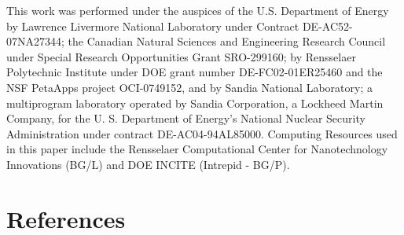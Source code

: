 \documentclass[letterpaper]{jpconf}
\begin{document}
\ack
This work was performed under the auspices of the U.S. Department of
Energy by Lawrence Livermore National Laboratory under Contract
DE-AC52-07NA27344; the Canadian Natural Sciences and Engineering
Research Council under Special Research Opportunities Grant
SRO-299160; by Rensselaer Polytechnic Institute under DOE grant number
DE-FC02-01ER25460 and the NSF PetaApps project OCI-0749152, and by
Sandia National Laboratory; a multiprogram laboratory operated by
Sandia Corporation, a Lockheed Martin Company, for the U. S.
Department of Energy's National Nuclear Security Administration under
contract DE-AC04-94AL85000.  Computing Resources used in this paper
include the Rensselaer Computational Center for Nanotechnology
Innovations (BG/L) and DOE INCITE (Intrepid - BG/P).

\section*{References}


\end{document}
